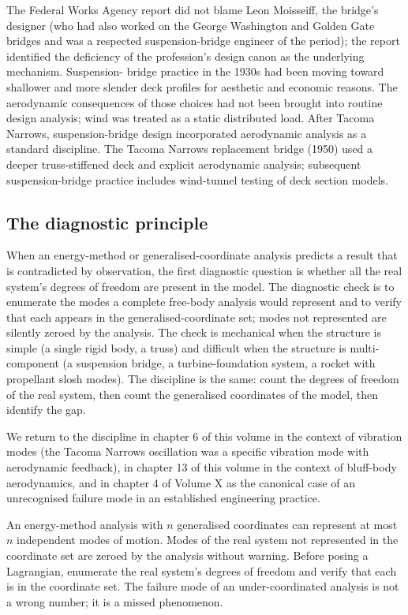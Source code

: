 The Federal Works Agency report did not blame Leon Moisseiff, the
bridge's designer (who had also worked on the George Washington and
Golden Gate bridges and was a respected suspension-bridge engineer
of the period); the report identified the deficiency of the
profession's design canon as the underlying mechanism. Suspension-
bridge practice in the 1930s had been moving toward shallower and
more slender deck profiles for aesthetic and economic reasons. The
aerodynamic consequences of those choices had not been brought into
routine design analysis; wind was treated as a static distributed
load. After Tacoma Narrows, suspension-bridge design incorporated
aerodynamic analysis as a standard discipline. The Tacoma Narrows
replacement bridge (1950) used a deeper truss-stiffened deck and
explicit aerodynamic analysis; subsequent suspension-bridge
practice includes wind-tunnel testing of deck section models.

\subsection{The diagnostic principle}

When an energy-method or generalised-coordinate analysis predicts a
result that is contradicted by observation, the first diagnostic
question is whether all the real system's degrees of freedom are
present in the model. The diagnostic check is to enumerate the
modes a complete free-body analysis would represent and to verify
that each appears in the generalised-coordinate set; modes not
represented are silently zeroed by the analysis. The check is
mechanical when the structure is simple (a single rigid body, a
truss) and difficult when the structure is multi-component (a
suspension bridge, a turbine-foundation system, a rocket with
propellant slosh modes). The discipline is the same: count the
degrees of freedom of the real system, then count the generalised
coordinates of the model, then identify the gap.

We return to the discipline in chapter 6 of this volume in the
context of vibration modes (the Tacoma Narrows oscillation was a
specific vibration mode with aerodynamic feedback), in chapter 13
of this volume in the context of bluff-body aerodynamics, and in
chapter 4 of Volume X as the canonical case of an unrecognised
failure mode in an established engineering practice.

\begin{principle}
An energy-method analysis with $n$ generalised coordinates can
represent at most $n$ independent modes of motion. Modes of the
real system not represented in the coordinate set are zeroed by
the analysis without warning. Before posing a Lagrangian, enumerate
the real system's degrees of freedom and verify that each is in the
coordinate set. The failure mode of an under-coordinated analysis
is not a wrong number; it is a missed phenomenon.
\end{principle}

